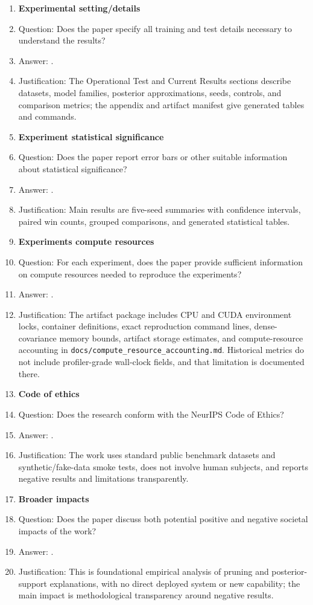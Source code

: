 \begin{enumerate}
\item {\bf Experimental setting/details}
    \item[] Question: Does the paper specify all training and test details necessary to understand the results?
    \item[] Answer: \answerYes{}.
    \item[] Justification: The Operational Test and Current Results sections describe datasets, model families, posterior approximations, seeds, controls, and comparison metrics; the appendix and artifact manifest give generated tables and commands.

\item {\bf Experiment statistical significance}
    \item[] Question: Does the paper report error bars or other suitable information about statistical significance?
    \item[] Answer: \answerYes{}.
    \item[] Justification: Main results are five-seed summaries with confidence intervals, paired win counts, grouped comparisons, and generated statistical tables.

\item {\bf Experiments compute resources}
    \item[] Question: For each experiment, does the paper provide sufficient information on compute resources needed to reproduce the experiments?
    \item[] Answer: \answerYes{}.
    \item[] Justification: The artifact package includes CPU and CUDA environment locks, container definitions, exact reproduction command lines, dense-covariance memory bounds, artifact storage estimates, and compute-resource accounting in \texttt{docs/compute\_resource\_accounting.md}. Historical metrics do not include profiler-grade wall-clock fields, and that limitation is documented there.

\item {\bf Code of ethics}
    \item[] Question: Does the research conform with the NeurIPS Code of Ethics?
    \item[] Answer: \answerYes{}.
    \item[] Justification: The work uses standard public benchmark datasets and synthetic/fake-data smoke tests, does not involve human subjects, and reports negative results and limitations transparently.

\item {\bf Broader impacts}
    \item[] Question: Does the paper discuss both potential positive and negative societal impacts of the work?
    \item[] Answer: \answerNA{}.
    \item[] Justification: This is foundational empirical analysis of pruning and posterior-support explanations, with no direct deployed system or new capability; the main impact is methodological transparency around negative results.


\end{enumerate}
